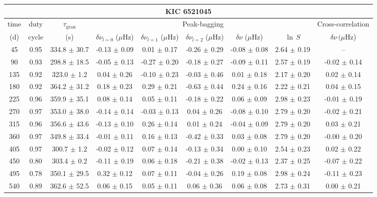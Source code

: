 \documentclass[twocolumn]{aastex61}%
\begin{document}
\begin{table*}[ht]\centering\fontsize{9.}{7.}\selectfont
\begin{tabular}{ccc|ccccc|c}
\multicolumn{9}{c}{KIC 6521045}\\ \hline\hline
time & duty & $\tau_\text{gran}$ &\multicolumn{5}{c|}{Peak-bagging}&Cross-correlation\\
(d)& cycle & (s)&$\delta\nu_{l=0}$ ($\mu$Hz) & $\delta\nu_{l=1}$ ($\mu$Hz) & $\delta\nu_{l=2}$ ($\mu$Hz) & $\delta\nu$ ($\mu$Hz)& $\ln\,S$ & $\delta\nu\,(\mu$Hz)\\\hline
45 & 0.95 & 334.8 $\pm$ 30.7 & -0.13 $\pm$ 0.09 & 0.01 $\pm$ 0.17 & -0.26 $\pm$ 0.29 & -0.08 $\pm$ 0.08 & 2.64 $\pm$ 0.19 & --\\
90 & 0.93 & 298.8 $\pm$ 18.5 & -0.05 $\pm$ 0.13 & -0.27 $\pm$ 0.20 & -0.18 $\pm$ 0.27 & -0.09 $\pm$ 0.11 & 2.57 $\pm$ 0.19 & -0.02 $\pm$ 0.14\\
135 & 0.92 & 323.0 $\pm$ 1.2 & 0.04 $\pm$ 0.26 & -0.10 $\pm$ 0.23 & -0.03 $\pm$ 0.46 & 0.01 $\pm$ 0.18 & 2.17 $\pm$ 0.20 & 0.02 $\pm$ 0.14\\
180 & 0.92 & 364.2 $\pm$ 31.2 & 0.18 $\pm$ 0.23 & 0.29 $\pm$ 0.21 & -0.63 $\pm$ 0.44 & 0.24 $\pm$ 0.16 & 2.22 $\pm$ 0.21 & 0.04 $\pm$ 0.15\\
225 & 0.96 & 359.9 $\pm$ 35.1 & 0.08 $\pm$ 0.14 & 0.05 $\pm$ 0.11 & -0.18 $\pm$ 0.22 & 0.06 $\pm$ 0.09 & 2.98 $\pm$ 0.23 & -0.01 $\pm$ 0.19\\
270 & 0.97 & 353.0 $\pm$ 38.0 & -0.14 $\pm$ 0.14 & -0.03 $\pm$ 0.13 & 0.04 $\pm$ 0.26 & -0.08 $\pm$ 0.10 & 2.79 $\pm$ 0.20 & -0.02 $\pm$ 0.21\\
315 & 0.96 & 356.6 $\pm$ 43.6 & -0.13 $\pm$ 0.10 & 0.26 $\pm$ 0.14 & 0.01 $\pm$ 0.24 & -0.04 $\pm$ 0.09 & 2.79 $\pm$ 0.20 & 0.03 $\pm$ 0.21\\
360 & 0.97 & 349.8 $\pm$ 33.4 & -0.01 $\pm$ 0.11 & 0.16 $\pm$ 0.13 & -0.42 $\pm$ 0.33 & 0.03 $\pm$ 0.08 & 2.79 $\pm$ 0.20 & -0.00 $\pm$ 0.20\\
405 & 0.97 & 300.7 $\pm$ 1.2 & -0.02 $\pm$ 0.12 & 0.07 $\pm$ 0.14 & -0.13 $\pm$ 0.34 & 0.00 $\pm$ 0.10 & 2.54 $\pm$ 0.23 & 0.02 $\pm$ 0.22\\
450 & 0.80 & 303.4 $\pm$ 0.2 & -0.11 $\pm$ 0.19 & 0.06 $\pm$ 0.18 & -0.21 $\pm$ 0.38 & -0.02 $\pm$ 0.13 & 2.37 $\pm$ 0.25 & -0.07 $\pm$ 0.22\\
495 & 0.78 & 350.1 $\pm$ 29.5 & 0.32 $\pm$ 0.12 & 0.07 $\pm$ 0.11 & -0.04 $\pm$ 0.26 & 0.19 $\pm$ 0.08 & 2.98 $\pm$ 0.24 & -0.11 $\pm$ 0.23\\
540 & 0.89 & 362.6 $\pm$ 52.5 & 0.06 $\pm$ 0.15 & 0.05 $\pm$ 0.11 & 0.06 $\pm$ 0.36 & 0.06 $\pm$ 0.08 & 2.73 $\pm$ 0.31 & 0.00 $\pm$ 0.21\\

\end{tabular}
\end{table*}
\end{document}
